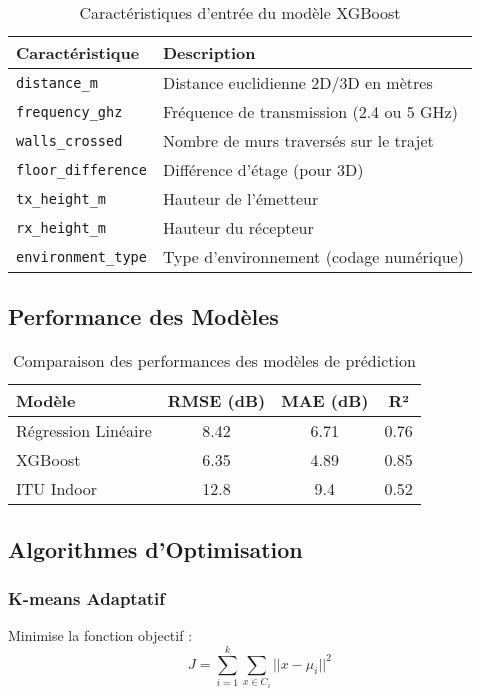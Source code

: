 \documentclass[12pt,a4paper]{article}
\begin{document}
\begin{table}[H]
\centering
\begin{tabular}{|l|p{8cm}|}
\hline
\textbf{Caractéristique} & \textbf{Description} \\
\hline
\texttt{distance\_m} & Distance euclidienne 2D/3D en mètres \\
\texttt{frequency\_ghz} & Fréquence de transmission (2.4 ou 5 GHz) \\
\texttt{walls\_crossed} & Nombre de murs traversés sur le trajet \\
\texttt{floor\_difference} & Différence d'étage (pour 3D) \\
\texttt{tx\_height\_m} & Hauteur de l'émetteur \\
\texttt{rx\_height\_m} & Hauteur du récepteur \\
\texttt{environment\_type} & Type d'environnement (codage numérique) \\
\hline
\end{tabular}
\caption{Caractéristiques d'entrée du modèle XGBoost}
\end{table}

\subsection{Performance des Modèles}

\begin{table}[H]
\centering
\begin{tabular}{|l|c|c|c|}
\hline
\textbf{Modèle} & \textbf{RMSE (dB)} & \textbf{MAE (dB)} & \textbf{R²} \\
\hline
Régression Linéaire & 8.42 & 6.71 & 0.76 \\
XGBoost & 6.35 & 4.89 & 0.85 \\
ITU Indoor & 12.8 & 9.4 & 0.52 \\
\hline
\end{tabular}
\caption{Comparaison des performances des modèles de prédiction}
\end{table}

\subsection{Algorithmes d'Optimisation}

\subsubsection{K-means Adaptatif}
Minimise la fonction objectif :
\begin{equation}
J = \sum_{i=1}^{k} \sum_{x \in C_i} ||x - \mu_i||^2
\end{equation}
\end{document}
